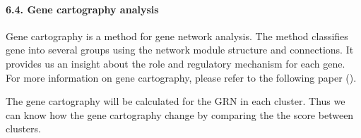 \documentclass[letterpaper,10pt,english]{sphinxmanual}
\begin{document}
\paragraph{6.4. Gene cartography analysis}
\label{\detokenize{notebooks/04_Network_analysis/Network_analysis_with_with_Paul_etal_2015_data:6.4.-Gene-cartography-analysis}}
Gene cartography is a method for gene network analysis. The method classifies gene into several groups using the network module structure and connections. It provides us an insight about the role and regulatory mechanism for each gene. For more information on gene cartography, please refer to the following paper ().

The gene cartography will be calculated for the GRN in each cluster. Thus we can know how the gene cartography change by comparing the the score between clusters.

{
\begin{sphinxVerbatim}[commandchars=\\\{\}]
\llap{\color{nbsphinxin}[58]:\,\hspace{\fboxrule}\hspace{\fboxsep}}
                                           \PYG{p}{[}  \PYG{p}{]}
                                            
                                            
\end{sphinxVerbatim}
}
\end{document}

